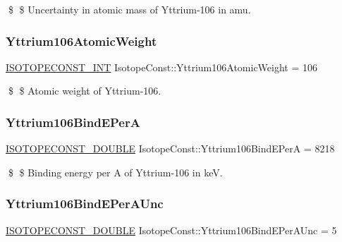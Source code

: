 \$ \$ Uncertainty in atomic mass of Yttrium-\/106 in amu. \mbox{\label{group___isotope_const-_yttrium-_y106_ga20c0c02f3dc5037194955cec72939000}} 
\subsubsection{\texorpdfstring{Yttrium106\+Atomic\+Weight}{Yttrium106AtomicWeight}}
{\footnotesize\ttfamily \mbox{\hyperlink{group___isotope_const-_macros_ga5f18360b3e99483a35c32d789e62621c}{I\+S\+O\+T\+O\+P\+E\+C\+O\+N\+S\+T\+\_\+\+I\+NT}} Isotope\+Const\+::\+Yttrium106\+Atomic\+Weight = 106}

\$ \$ Atomic weight of Yttrium-\/106. \mbox{\label{group___isotope_const-_yttrium-_y106_ga64a88780b9b54e3208009e124575bc75}} 
\subsubsection{\texorpdfstring{Yttrium106\+Bind\+E\+PerA}{Yttrium106BindEPerA}}
{\footnotesize\ttfamily \mbox{\hyperlink{group___isotope_const-_macros_ga8f45a7272ce02c0b4c65c44636ed719a}{I\+S\+O\+T\+O\+P\+E\+C\+O\+N\+S\+T\+\_\+\+D\+O\+U\+B\+LE}} Isotope\+Const\+::\+Yttrium106\+Bind\+E\+PerA = 8218}

\$ \$ Binding energy per A of Yttrium-\/106 in keV. \mbox{\label{group___isotope_const-_yttrium-_y106_ga1838aa317c9754774bba93f412acf471}} 
\subsubsection{\texorpdfstring{Yttrium106\+Bind\+E\+Per\+A\+Unc}{Yttrium106BindEPerAUnc}}
{\footnotesize\ttfamily \mbox{\hyperlink{group___isotope_const-_macros_ga8f45a7272ce02c0b4c65c44636ed719a}{I\+S\+O\+T\+O\+P\+E\+C\+O\+N\+S\+T\+\_\+\+D\+O\+U\+B\+LE}} Isotope\+Const\+::\+Yttrium106\+Bind\+E\+Per\+A\+Unc = 5}

